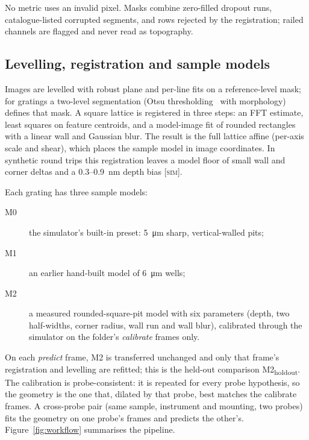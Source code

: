 \documentclass[preprint,12pt]{elsarticle}
\newcommand{\tags}{\textsc{[sim]}}
\begin{document}
No metric uses an invalid pixel. Masks combine zero-filled dropout runs, catalogue-listed
corrupted segments, and rows rejected by the registration; railed channels are flagged and never
read as topography.

\subsection{Levelling, registration and sample models}

Images are levelled with robust plane and per-line fits on a reference-level mask; for gratings a
two-level segmentation (Otsu thresholding~\cite{otsu1979} with morphology) defines that mask. A
square lattice is registered in three steps: an FFT estimate, least squares on feature centroids,
and a model-image fit of rounded rectangles with a linear wall and Gaussian blur. The result is the
full lattice affine (per-axis scale and shear), which places the sample model in image
coordinates. In synthetic round trips this registration leaves a model floor of small wall and
corner deltas and a 0.3--0.9~nm depth bias \tags.

Each grating has three sample models:
\begin{description}
  \item[M0] the simulator's built-in preset: 5~\si{\micro\metre} sharp, vertical-walled pits;
  \item[M1] an earlier hand-built model of 6~\si{\micro\metre} wells;
  \item[M2] a measured rounded-square-pit model with six parameters (depth, two half-widths,
        corner radius, wall run and wall blur), calibrated through the simulator on the
        folder's \emph{calibrate} frames only.
\end{description}
On each \emph{predict} frame, M2 is transferred unchanged and only that frame's registration and
levelling are refitted; this is the held-out comparison M2\textsubscript{holdout}. The
calibration is probe-consistent: it is repeated for every probe hypothesis, so the geometry is the
one that, dilated by that probe, best matches the calibrate frames. A cross-probe pair (same
sample, instrument and mounting, two probes) fits the geometry on one probe's frames and predicts
the other's. Figure~\ref{fig:workflow} summarises the pipeline.
\end{document}
